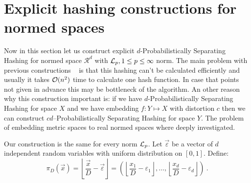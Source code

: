 \documentclass[11pt]{article}
\newcommand{\calO}{{\cal{O}}}
\begin{document}
\section{Explicit hashing constructions for normed spaces}{\label{explicit}}
Now in this section let us construct explicit
$d$-Probabilistically Separating Hashing for normed space
$\mathcal{R}^d$ with ${\cal{L}}_p, 1 \leq p \leq \infty$ norm. The
main problem with previous constructions ~\cite{CCGGP98} is that
this hashing can't be calculated efficiently and usually it takes
$\calO(n^2)$ time to calculate one hash function. In case that
points not given in advance this may be bottleneck of the
algorithm.
 An other reason why this construction important is:
  if we have  $d$-Probabilistically Separating Hashing for space $X$ and we have embedding $f:Y \mapsto X$ with distortion $c$
  then we can construct $cd$--Probabilistically Separating Hashing for space $Y$.
  The problem of embedding metric spaces to real normed spaces where deeply investigated.

Our construction is the same for every norm ${\cal{L}}_p$.
 Let $\vec{\varepsilon}$ be a vector
of $d $ independent random variables with uniform distribution on
$[0,1]$. Define:
\begin{equation}
  \pi_D(\vec{x})=\left\lfloor \frac{\vec{x}}{D}-
  \vec{\varepsilon}\right\rfloor =
   \left(\left\lfloor\frac{x_1}{D}-
  \varepsilon_1\right\rfloor
,\ldots,\left\lfloor\frac{x_d}{D}-
  \varepsilon_d\right\rfloor\right)\ .
\end{equation}
\end{document}
